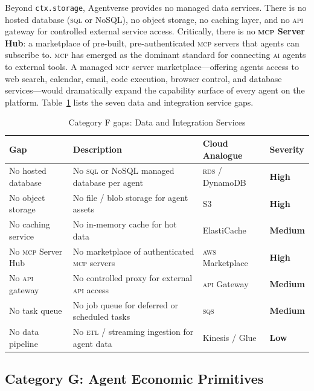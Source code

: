 \documentclass[twoside,11pt]{article}
\newcommand{\high}{\textcolor{red!70!black}{\textbf{High}}}
\newcommand{\medium}{\textcolor{orange!80!black}{\textbf{Medium}}}
\newcommand{\low}{\textcolor{green!50!black}{\textbf{Low}}}
\begin{document}
Beyond \texttt{ctx.storage}, Agentverse provides no managed data services.
There is no hosted database (\textsc{sql} or NoSQL), no object storage, no
caching layer, and no \textsc{api} gateway for controlled external service
access.  Critically, there is no \textbf{\textsc{mcp} Server Hub}: a
marketplace of pre-built, pre-authenticated \textsc{mcp} servers that agents
can subscribe to.  \textsc{mcp} has emerged as the dominant standard for
connecting \textsc{ai} agents to external tools.  A managed \textsc{mcp} server
marketplace---offering agents access to web search, calendar, email, code
execution, browser control, and database services---would dramatically expand
the capability surface of every agent on the platform.
Table~\ref{tab:gap-data} lists the seven data and integration service gaps.

\begin{table}[htbp]
\centering
\caption{Category F gaps: Data and Integration Services}
\label{tab:gap-data}
\begin{tabular}{p{3.2cm} p{5.5cm} p{2.9cm} l}
\toprule
\textbf{Gap} & \textbf{Description} & \textbf{Cloud Analogue} &
\textbf{Severity} \\
\midrule
No hosted database & No \textsc{sql} or NoSQL managed database per agent &
\textsc{rds} / DynamoDB & \high \\[4pt]
No object storage & No file / blob storage for agent assets & S3 & \high \\[4pt]
No caching service & No in-memory cache for hot data & ElastiCache & \medium \\[4pt]
No \textsc{mcp} Server Hub & No marketplace of authenticated \textsc{mcp}
servers & \textsc{aws} Marketplace & \high \\[4pt]
No \textsc{api} gateway & No controlled proxy for external \textsc{api} access &
\textsc{api} Gateway & \medium \\[4pt]
No task queue & No job queue for deferred or scheduled tasks & \textsc{sqs} &
\medium \\[4pt]
No data pipeline & No \textsc{etl} / streaming ingestion for agent data &
Kinesis / Glue & \low \\
\bottomrule
\end{tabular}
\end{table}

\subsection{Category G: Agent Economic Primitives}
\label{subsec:gap-economy}
\end{document}

